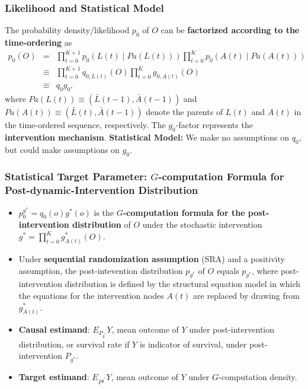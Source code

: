 \documentclass[t]{beamer}
\begin{document}
\begin{frame}
\frametitle{Likelihood and Statistical Model}
The probability density/likelihood $p_0$ of $O$ can be {\bf factorized according to the time-ordering} as
\begin{eqnarray*}
p_0(O)&=&\prod_{t=0}^{K+1} p_0(L(t)\mid Pa(L(t)) ) \prod_{t=0}^K p_0(A(t)\mid Pa(A(t)) )\\
&\equiv& \prod_{t=0}^{K+1}q_{0,L(t)}(O)\prod_{t=0}^K g_{0,A(t)}(O)\\
&\equiv& q_0g_0,
\end{eqnarray*}
where $Pa(L(t))\equiv (\bar{L}(t-1),\bar{A}(t-1))$ and $Pa(A(t))\equiv (\bar{L}(t),\bar{A}(t-1))$ denote the parents  of $L(t)$ and $A(t)$ in the time-ordered sequence, respectively.
The $g_0$-factor represents the {\bf intervention mechanism}.\newline
{\bf Statistical Model:}
We make no assumptions on $q_0$, but could make assumptions on $g_0$.
\end{frame}


\begin{frame}
\frametitle{Statistical Target Parameter: $G$-computation Formula for Post-dynamic-Intervention Distribution}
\begin{itemize}
\item $p^{g^*}_0=q_0(o)g^*(o)$ is the {\bf $G$-computation formula for the post-intervention distribution} of $O$ under the stochastic intervention $g^*=\prod_{t=0}^K g^*_{A(t)}(O)$.
\item Under {\bf sequential randomization assumption} (SRA) and a positivity assumption, the post-intevention distribution $p_{g^*}$ of $O$ equals $p_{g^*}$, where post-intervention distribution is defined by the structural equation model in which the equations for the intervention nodes $A(t)$ are replaced by drawing from $g^*_{A(t)}$.
\item {\bf Causal estimand}: $E_{P_{g^*}}Y$, mean outcome of $Y$ under post-intervention distribution, or survival rate if $Y$ is indicator of survival, under  post-intervention $P_{g^*}$.
\item {\bf Target estimand}: $E_{P^{g^*}}Y$, mean outcome of $Y$ under $G$-computation density.
\end{itemize}
\end{frame}
\end{document}
